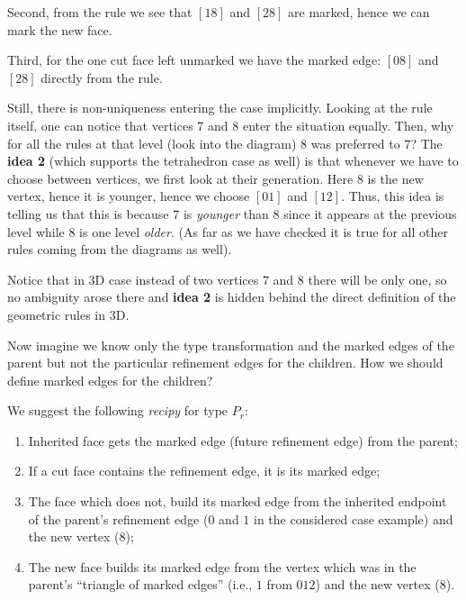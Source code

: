 \documentclass[a4paper,12pt]{amsart}
\numberwithin{equation}{section}
\begin{document}
\begin{itemize}
    Second, from the rule we see that $\left[18\right]$ and $\left[28\right]$ are marked, hence we can mark the new face.
    
    Third, for the one cut face left unmarked we have the marked edge: $\left[08\right]$ and $\left[28\right]$ directly from the rule.
      
    Still, there is non-uniqueness entering the case implicitly. Looking at the rule itself, one can notice that vertices $7$ and $8$ enter the situation equally. Then, why for all the rules at that level (look into the diagram) $8$ was preferred to $7$? The \textbf{idea 2} (which supports the tetrahedron case as well) is that whenever we have to choose between vertices, we first look at their generation. Here $8$ is the new vertex, hence it is younger, hence we choose $\left[01\right]$ and $\left[12\right]$. Thus, this idea is telling us that this is because $7$ is \textit{younger} than $8$ since it appears at the previous level while $8$ is one level \textit{older}. (As far as we have checked it is true for all other rules coming from the diagrams as well).
    
    Notice that in 3D case instead of two vertices $7$ and $8$ there will be only one, so no ambiguity arose there and \textbf{idea 2} is hidden behind the direct definition of the geometric rules in 3D.

	Now imagine we know only the type transformation and the marked edges of the parent but not the particular refinement edges for the children. How we should define marked edges for the children?
	
	We suggest the following \textit{recipy} for type $P_r$:
	\begin{enumerate}
		\item Inherited face gets the marked edge (future refinement edge) from the parent;
		\item If a cut face contains the refinement edge, it is its marked edge;
		\item The face which does not, build its marked edge from the inherited endpoint of the parent's refinement edge ($0$ and $1$ in the considered case example) and the new vertex ($8$);
		\item The new face builds its marked edge from the vertex which was in the parent's ``triangle of marked edges'' (i.e., $1$ from $012$)  and the new vertex ($8$).
	\end{enumerate}
    

\end{itemize}
\end{document}
